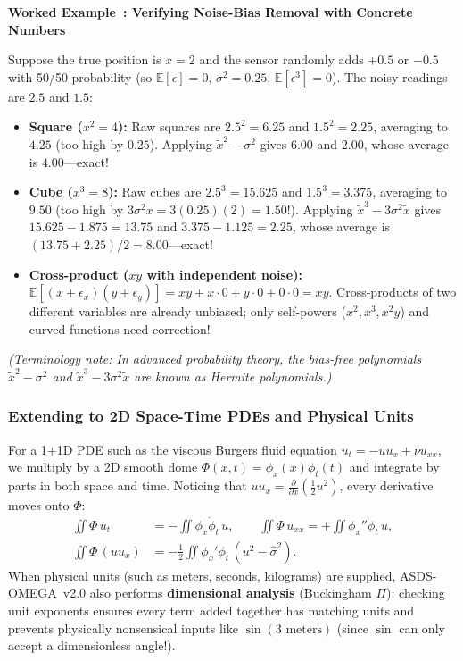 \documentclass[11pt,a4paper]{article}
\newcounter{workedexcnt}
\newenvironment{workedexample}[1]{%
  \refstepcounter{workedexcnt}%
  \begin{lrbox}{\calloutbox}%
    \begin{minipage}{\dimexpr\textwidth-2\fboxsep-2\fboxrule\relax}
      \vspace{0.3em}
      \noindent\textbf{\color{black!85}Worked Example~\theworkedexcnt: #1}\par\smallskip
      \normalfont
}{%
      \vspace{0.3em}
    \end{minipage}%
  \end{lrbox}%
  \par\medskip\noindent
  \fcolorbox{gray!45}{gray!8}{\usebox{\calloutbox}}%
  \par\medskip
}
\begin{document}
\begin{workedexample}{Verifying Noise-Bias Removal with Concrete Numbers}
Suppose the true position is $x = 2$ and the sensor randomly adds $+0.5$ or $-0.5$ with 50/50 probability (so $\mathbb{E}[\epsilon] = 0$, $\sigma^2 = 0.25$, $\mathbb{E}[\epsilon^3] = 0$). The noisy readings are $2.5$ and $1.5$:
\begin{itemize}
  \item \textbf{Square ($x^2 = 4$):} Raw squares are $2.5^2 = 6.25$ and $1.5^2 = 2.25$, averaging to $\mathbf{4.25}$ (too high by $0.25$). Applying $\tilde{x}^2 - \sigma^2$ gives $6.00$ and $2.00$, whose average is $\mathbf{4.00}$—exact!
  \item \textbf{Cube ($x^3 = 8$):} Raw cubes are $2.5^3 = 15.625$ and $1.5^3 = 3.375$, averaging to $\mathbf{9.50}$ (too high by $3\sigma^2 x = 3(0.25)(2) = 1.50$!). Applying $\tilde{x}^3 - 3\sigma^2 \tilde{x}$ gives $15.625 - 1.875 = 13.75$ and $3.375 - 1.125 = 2.25$, whose average is $(13.75 + 2.25)/2 = \mathbf{8.00}$—exact!
  \item \textbf{Cross-product ($xy$ with independent noise):} $\mathbb{E}[(x+\epsilon_x)(y+\epsilon_y)] = xy + x\cdot 0 + y\cdot 0 + 0\cdot 0 = xy$. Cross-products of two different variables are already unbiased; only self-powers ($x^2, x^3, x^2y$) and curved functions need correction!
\end{itemize}
\textit{(Terminology note: In advanced probability theory, the bias-free polynomials $\tilde{x}^2 - \sigma^2$ and $\tilde{x}^3 - 3\sigma^2\tilde{x}$ are known as Hermite polynomials.)}
\end{workedexample}

\subsubsection{Extending to 2D Space-Time PDEs and Physical Units}
For a 1+1D PDE such as the viscous Burgers fluid equation $u_t = -u u_x + \nu u_{xx}$, we multiply by a 2D smooth dome $\Phi(x,t) = \phi_x(x)\phi_t(t)$ and integrate by parts in both space and time. Noticing that $u u_x = \frac{\partial}{\partial x}\!\left(\frac{1}{2}u^2\right)$, every derivative moves onto $\Phi$:
\begin{align}
  \iint \Phi\,u_t &= -\iint \phi_x \dot{\phi}_t\,u, \qquad
  \iint \Phi\,u_{xx} = +\iint \phi_x''\phi_t\,u, \\
  \iint \Phi\,(u u_x) &= -\frac{1}{2}\iint \phi_x'\phi_t\,(u^2 - \hat{\sigma}^2).
\end{align}
When physical units (such as meters, seconds, kilograms) are supplied, ASDS-OMEGA~v2.0 also performs \textbf{dimensional analysis} (Buckingham $\Pi$): checking unit exponents ensures every term added together has matching units and prevents physically nonsensical inputs like $\sin(3\text{ meters})$ (since $\sin$ can only accept a dimensionless angle!).
\end{document}
